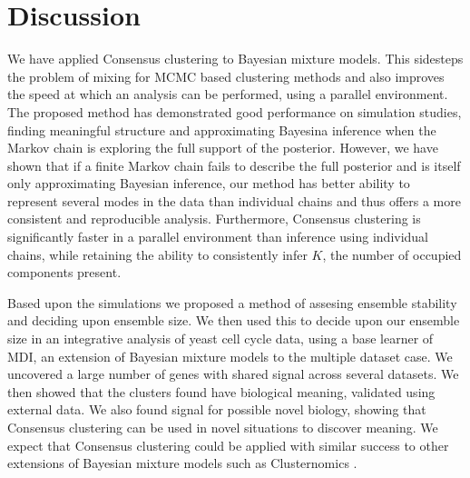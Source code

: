 \documentclass{bioinfo}
\begin{document}

\section{Discussion}

We have applied Consensus clustering to Bayesian mixture models. This sidesteps the problem of mixing for MCMC based clustering methods and also improves the speed at which an analysis can be performed, using a parallel environment. The proposed method has demonstrated good performance on simulation studies, finding meaningful structure and approximating Bayesina inference when the Markov chain is exploring the full support of the posterior. However, we have shown that if a finite Markov chain fails to describe the full posterior and is itself only approximating Bayesian inference, our method has better ability to represent several modes in the data than individual chains and thus offers a more consistent and reproducible analysis. Furthermore, Consensus clustering is significantly faster in a parallel environment than inference using individual chains, while retaining the ability to consistently infer $K$, the number of occupied components present. 

Based upon the simulations we proposed a method of assesing ensemble stability and deciding upon ensemble size. We then used this to decide upon our ensemble size in an integrative analysis of yeast cell cycle data, using a base learner of MDI, an extension of Bayesian mixture models to the multiple dataset case. We uncovered a large number of genes with shared signal across several datasets. We then showed that the clusters found have biological meaning, validated using external data. We also found signal for possible novel biology, showing that Consensus clustering can be used in novel situations to discover meaning. We expect that Consensus clustering could be applied with similar success to other extensions of Bayesian mixture models such as Clusternomics \citep{gabasova2017clusternomics}.
\end{document}
